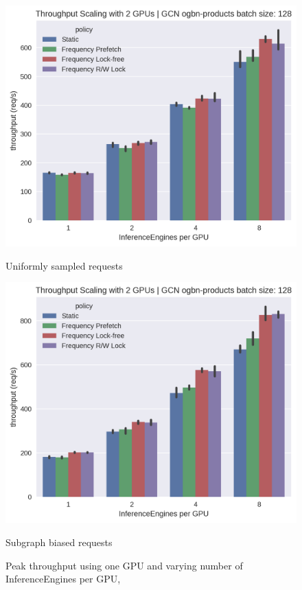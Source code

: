 \begin{figure}[h!]
    \centering
    \begin{minipage}[c]{0.48\textwidth}
        \centering
        \includegraphics[width=\textwidth]{figures/throughput_GCN_uniform_pinnedc0.2_gpus_2.png}
        \caption*{Uniformly sampled requests}
    \end{minipage}
    \hfill
    \begin{minipage}[c]{0.48\textwidth}
        \centering
        \includegraphics[width=\textwidth]{figures/throughput_GCN_bias_0.8_pinnedc0.2_gpus_2.png}    
        \caption*{Subgraph biased requests}
    \end{minipage}
    \caption{Peak throughput using one GPU and varying number of InferenceEngines per GPU,}
    \label{Eval: Throughput 2 GPU}
\end{figure}   
